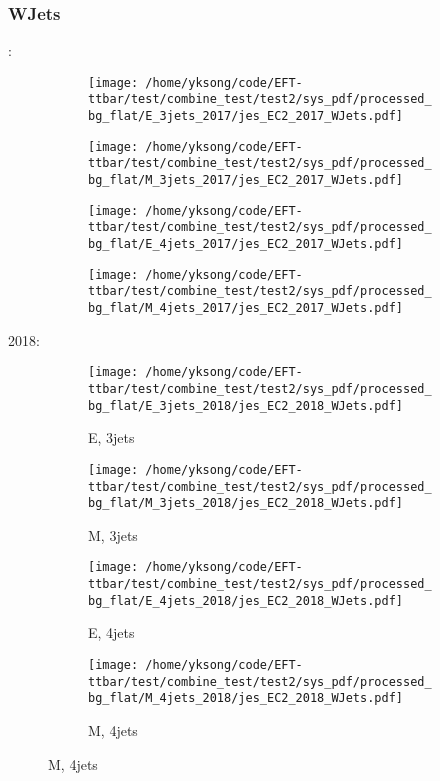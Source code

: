 \documentclass{beamer}
\begin{document}
\begin{frame}
\frametitle{WJets}
\fontsize{5}{1}:
\begin{figure}
\centering
\begin{subfigure}[b]{0.24\textwidth}
\texttt{[image: /home/yksong/code/EFT-ttbar/test/combine\_test/test2/sys\_pdf/processed\_bg\_flat/E\_3jets\_2017/jes\_EC2\_2017\_WJets.pdf]}
\end{subfigure}
\begin{subfigure}[b]{0.24\textwidth}
\texttt{[image: /home/yksong/code/EFT-ttbar/test/combine\_test/test2/sys\_pdf/processed\_bg\_flat/M\_3jets\_2017/jes\_EC2\_2017\_WJets.pdf]}
\end{subfigure}
\begin{subfigure}[b]{0.24\textwidth}
\texttt{[image: /home/yksong/code/EFT-ttbar/test/combine\_test/test2/sys\_pdf/processed\_bg\_flat/E\_4jets\_2017/jes\_EC2\_2017\_WJets.pdf]}
\end{subfigure}
\begin{subfigure}[b]{0.24\textwidth}
\texttt{[image: /home/yksong/code/EFT-ttbar/test/combine\_test/test2/sys\_pdf/processed\_bg\_flat/M\_4jets\_2017/jes\_EC2\_2017\_WJets.pdf]}
\end{subfigure}
\end{figure}
2018:
\begin{figure}
\centering
\begin{subfigure}[b]{0.24\textwidth}
\texttt{[image: /home/yksong/code/EFT-ttbar/test/combine\_test/test2/sys\_pdf/processed\_bg\_flat/E\_3jets\_2018/jes\_EC2\_2018\_WJets.pdf]}
\captionsetup{font=tiny}
\caption{E, 3jets}
\end{subfigure}
\begin{subfigure}[b]{0.24\textwidth}
\texttt{[image: /home/yksong/code/EFT-ttbar/test/combine\_test/test2/sys\_pdf/processed\_bg\_flat/M\_3jets\_2018/jes\_EC2\_2018\_WJets.pdf]}
\captionsetup{font=tiny}
\caption{M, 3jets}
\end{subfigure}
\begin{subfigure}[b]{0.24\textwidth}
\texttt{[image: /home/yksong/code/EFT-ttbar/test/combine\_test/test2/sys\_pdf/processed\_bg\_flat/E\_4jets\_2018/jes\_EC2\_2018\_WJets.pdf]}
\captionsetup{font=tiny}
\caption{E, 4jets}
\end{subfigure}
\begin{subfigure}[b]{0.24\textwidth}
\texttt{[image: /home/yksong/code/EFT-ttbar/test/combine\_test/test2/sys\_pdf/processed\_bg\_flat/M\_4jets\_2018/jes\_EC2\_2018\_WJets.pdf]}
\captionsetup{font=tiny}
\caption{M, 4jets}
\end{subfigure}
\end{figure}
\end{frame}
\end{document}
